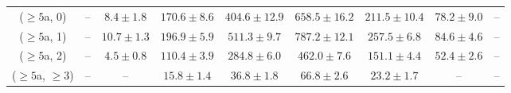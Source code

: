 \begin{table}[h!]
{\begin{tabular}{ccccccccc}
	($\ge5$a, 0) & -- & $8.4\pm 1.8$ & $170.6\pm 8.6$ & $404.6\pm 12.9$ & $658.5\pm 16.2$ & $211.5\pm 10.4$ & $78.2\pm 9.0$ & -- \\[0.5ex] 
	($\ge5$a, 1) & -- & $10.7\pm 1.3$ & $196.9\pm 5.9$ & $511.3\pm 9.7$ & $787.2\pm 12.1$ & $257.5\pm 6.8$ & $84.6\pm 4.6$ & -- \\[0.5ex] 
	($\ge5$a, 2) & -- & $4.5\pm 0.8$ & $110.4\pm 3.9$ & $284.8\pm 6.0$ & $462.0\pm 7.6$ & $151.1\pm 4.4$ & $52.4\pm 2.6$ & -- \\[0.5ex] 
	($\ge5$a, $\ge3$) & -- & -- & $15.8\pm 1.4$ & $36.8\pm 1.8$ & $66.8\pm 2.6$ & $23.2\pm 1.7$ & -- & -- \\[0.5ex] 
	\hline
	\hline
\end{tabular}}
\end{table}
